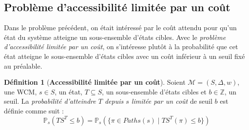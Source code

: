 \documentclass[12pt,a4paper]{report}
\theoremstyle{definition}%
\newtheorem{definition}{Définition}[chapter]
\theoremstyle{remark}
\newcommand{\pr}{\mathbb{P}}
\begin{document}
\subsection{Problème d'accessibilité limitée par un coût}
Dans le problème précédent, on était intéressé par le coût attendu pour qu'un état du système atteigne un sous-ensemble d'états cibles. Avec le \textit{problème d'accessibilité limitée par un coût}, on s'intéresse plutôt à la probabilité que cet état atteigne le sous-ensemble d'états cibles avec un coût inférieur à un seuil fixé au préalable.

\begin{definition}[\textbf{Accessibilité limitée par un coût}]
	Soient $\mathcal{M} = (S, \Delta, w)$, une WCM, $s \in S$, un état, $T \subseteq S$, un sous-ensemble d'états cibles et $b \in \mathbb{Z}$, un seuil. La \textit{probabilité d'atteindre $T$ depuis $s$ limitée par un coût} de seuil $b$ est définie comme suit : 
	\[\pr_s(TS^T \leq b) = \pr_s(\{\pi \in Paths(s) \; | \; TS^T(\pi) \leq b \}) \]
\end{definition}
\end{document}

